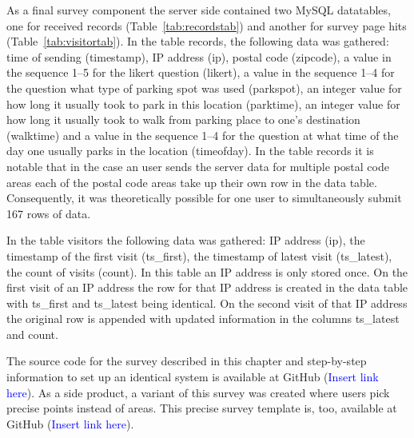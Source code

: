As a final survey component the server side contained two MySQL datatables, one for received records (Table~\ref{tab:recordstab}) and another for survey page hits (Table~\ref{tab:visitortab}). In the table records, the following data was gathered: time of sending (timestamp), IP address (ip), postal code (zipcode), a value in the sequence 1--5 for the likert question (likert), a value in the sequence 1--4 for the question what type of parking spot was used (parkspot), an integer value for how long it usually took to park in this location (parktime), an integer value for how long it usually took to walk from parking place to one's destination (walktime) and a value in the sequence 1--4 for the question at what time of the day one usually parks in the location (timeofday). In the table records it is notable that in the case an user sends the server data for multiple postal code areas each of the postal code areas take up their own row in the data table. Consequently, it was theoretically possible for one user to simultaneously submit 167 rows of data.

In the table visitors the following data was gathered: IP address (ip), the timestamp of the first visit (ts\_first), the timestamp of latest visit (ts\_latest), the count of visits (count). In this table an IP address is only stored once. On the first visit of an IP address the row for that IP address is created in the data table with ts\_first and ts\_latest being identical. On the second visit of that IP address the original row is appended with updated information in the columns ts\_latest and count.

The source code for the survey described in this chapter and step-by-step information to set up an identical system is available at GitHub (\textcolor{blue}{Insert link here}). As a side product, a variant of this survey was created where users pick precise points instead of areas. This precise survey template is, too, available at GitHub (\textcolor{blue}{Insert link here}).

